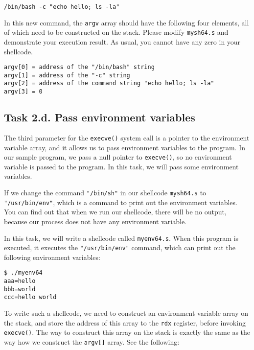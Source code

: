 \begin{lstlisting}
/bin/bash -c "echo hello; ls -la"
\end{lstlisting}

In this new command, the \texttt{argv} array should have 
the following four elements, all of which need to be 
constructed on the stack. Please modify \texttt{mysh64.s} and 
demonstrate your execution result. As usual, you cannot have 
any zero in your shellcode.

\begin{lstlisting}
argv[0] = address of the "/bin/bash" string
argv[1] = address of the "-c" string
argv[2] = address of the command string "echo hello; ls -la"
argv[3] = 0
\end{lstlisting}
 

\subsection{Task 2.d. Pass environment variables}

The third parameter for the \texttt{execve()} system call
is a pointer to the environment variable array, and it allows 
us to pass environment variables to the program. In our 
sample program, we pass a null pointer to \texttt{execve()}, so
no environment variable is passed to the program. 
In this task, we will pass some environment variables. 

If we change the command \texttt{"/bin/sh"} in our shellcode
\texttt{mysh64.s} to \texttt{"/usr/bin/env"}, which is a command to print out the 
environment variables. You can find out that when we run
our shellcode, there will be no output, because our 
process does not have any environment variable.

In this task, we will write a shellcode called \texttt{myenv64.s}. When this 
program is executed, it executes the \texttt{"/usr/bin/env"} command, which
can print out the following environment variables: 

\begin{lstlisting}
$ ./myenv64
aaa=hello
bbb=world
ccc=hello world
\end{lstlisting}

To write such a shellcode, we need to construct an
environment variable array on the stack, 
and store the address of this array to the \texttt{rdx} register,  
before invoking \texttt{execve()}.  
The way to construct this array on the stack is exactly the same
as the way how we construct the \texttt{argv[]} array. 
See the following: 

